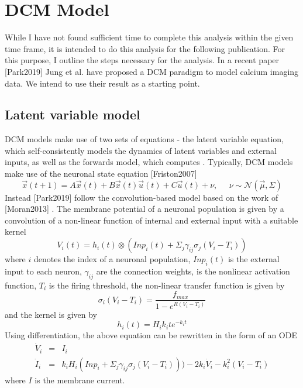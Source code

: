 \documentclass[a4paper,10pt]{article}
\begin{document}
\section{DCM Model}
While I have not found sufficient time to complete this analysis within the given time frame, it is intended to do this analysis for the following publication. For this purpose, I outline the steps necessary for the analysis. In a recent paper [Park2019] Jung et al. have proposed a DCM paradigm to model calcium imaging data. We intend to use their result as a starting point.

\subsection{Latent variable model}
DCM models make use of two sets of equations - the latent variable equation, which self-consistently models the dynamics of latent variables and external inputs, as well as the forwards model, which computes . Typically, DCM models make use of the neuronal state equation [Friston2007]
\begin{equation}
   \vec{x}(t+1) = A\vec{x}(t) + B \vec{x}(t) \vec{u}(t) + C\vec{u}(t) + \nu, \;\;\;\;\; \nu \sim \mathcal{N}(\vec{\mu}, \Sigma)
\end{equation}
Instead [Park2019] follow the convolution-based model based on the work of [Moran2013] . The membrane potential of a neuronal population is given by a convolution of a non-linear function of internal and external input with a suitable kernel
\begin{equation}
   V_i(t) = h_{i}(t) \otimes (Inp_i(t) + \Sigma_j \gamma_{ij} \sigma_j(V_i - T_i))
\end{equation}
where $i$ denotes the index of a neuronal population, $Inp_i(t)$ is the external input to each neuron, $\gamma_{ij}$ are the connection weights,  is the nonlinear activation function, $T_i$ is the firing threshold, the non-linear transfer function is given by
\begin{equation}
   \sigma_i(V_i - T_i) = \frac{f_{max}}{1 - e^{R(V_i - T_i)}}
\end{equation}
and the kernel is given by
\begin{equation}
   h_i(t) = H_i k_i t e^{-k_i t}
\end{equation}
Using differentiation, the above equation can be rewritten in the form of an ODE
\begin{eqnarray}
\dot{V}_i &=& I_i \\
\dot{I}_i &=& k_i H_i (Inp_i + \Sigma_j \gamma_{ij} \sigma_j(V_i - T_i))) - 2k_i \dot{V}_i - k_i^2 (V_i - T_i)
\end{eqnarray}
where $I$ is the membrane current.
\end{document}
